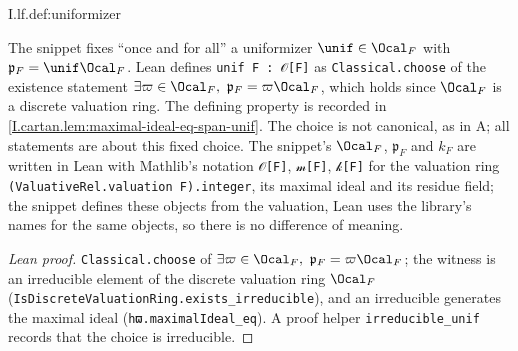 \begin{definition}[uniformizer]
\end{definition}
\begin{tfformal}{I.lf.def:uniformizer}
\begin{tffidelity}
The snippet fixes ``once and for all'' a uniformizer $\unif\in\Ocal_F$ with $\mathfrak p_F=\unif\Ocal_F$. Lean defines \texttt{unif F : 𝒪[F]} as \texttt{Classical.choose} of the existence statement $\exists\varpi\in\Ocal_F,\ \mathfrak p_F=\varpi\Ocal_F$, which holds since $\Ocal_F$ is a discrete valuation ring. The defining property is recorded in \cref{I.cartan.lem:maximal-ideal-eq-span-unif}. The choice is not canonical, as in A; all statements are about this fixed choice. The snippet's $\Ocal_F$, $\mathfrak p_F$ and $k_F$ are written in Lean with Mathlib's notation \texttt{𝒪[F]}, \texttt{𝓂[F]}, \texttt{𝓀[F]} for the valuation ring \texttt{(ValuativeRel.valuation F).integer}, its maximal ideal and its residue field; the snippet defines these objects from the valuation, Lean uses the library's names for the same objects, so there is no difference of meaning.
\end{tffidelity}
\end{tfformal}
\begin{proof}[Lean proof]
\texttt{Classical.choose} of $\exists\varpi\in\Ocal_F,\ \mathfrak p_F=\varpi\Ocal_F$; the witness is an irreducible element of the discrete valuation ring $\Ocal_F$ (\texttt{IsDiscreteValuationRing.exists\_irreducible}), and an irreducible generates the maximal ideal (\texttt{hϖ.maximalIdeal\_eq}). A proof helper \texttt{irreducible\_unif} records that the choice is irreducible.
\end{proof}

